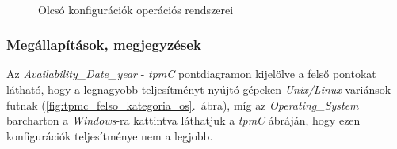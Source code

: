\documentclass[a4paper,10pt,titlepage]{article}
\begin{document}
\begin{figure}[h!]
  \centering
  ~~~ %
  \caption{Olcsó konfigurációk operációs rendszerei}
  \label{fig:alacsony_TC_operacios_rendszerek}
\end{figure}

\subsubsection*{Megállapítások, megjegyzések}
Az \emph{Availability\_Date\_year} - \emph{tpmC} pontdiagramon kijelölve a felső pontokat látható, hogy a legnagyobb teljesítményt nyújtó gépeken \emph{Unix/Linux} variánsok futnak (\ref{fig:tpmc_felso_kategoria_os}.~ábra), míg az \emph{Operating\_System} barcharton a \emph{Windows}-ra kattintva láthatjuk a \emph{tpmC} ábráján, hogy ezen konfigurációk teljesítménye nem a legjobb.
\end{document}
